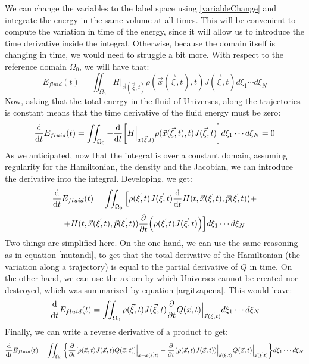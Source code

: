 \documentclass[11pt, a4paper]{article} %
\begin{document}
We can change the variables to the label space using \eqref{variableChange} and integrate the energy in the same volume at all times. This will be convenient to compute the variation in time of the energy, since it will allow us to introduce the time derivative inside the integral. Otherwise, because the domain itself is changing in time, we would need to struggle a bit more. With respect to the reference domain $\Omega_0$, we will have that:
\begin{equation}
E_{fluid}(t)=\iint_{\Omega_0} H\Big\rvert_{\vec{x}(\vec{\xi},t)}\rho(\vec{x}(\vec{\xi},t),t)J(\vec{\xi},t)d\xi_1\cdots d\xi_N
\end{equation}
Now, asking that the total energy in the fluid of Universes, along the trajectories is constant means that the time derivative of the fluid energy must be zero:
\begin{equation}
\dv{}{t}E_{fluid}(t)=\iint_{\Omega_0} -\dv{}{t}\qty[H\Big\rvert_{\vec{x}(\vec{\xi},t)}\rho(\vec{x}(\vec{\xi},t),t)J(\vec{\xi},t)]d\xi_1\cdots d\xi_N=0
\end{equation}
As we anticipated, now that the integral is over a constant domain, assuming regularity for the Hamiltonian, the density and the Jacobian, we can introduce the derivative into the integral. Developing, we get:
\begin{equation}
\dv{}{t}E_{fluid}(t)=\iint_{\Omega_0}\Big[ \rho(\vec{\xi},t)J(\vec{\xi},t)\dv{}{t}H(t, \vec{x}(\vec{\xi},t),\vec{p}(\vec{\xi},t))+
\end{equation}
$$
+H(t, \vec{x}(\vec{\xi},t),\vec{p}(\vec{\xi},t))\pdv{}{t}\qty(\rho(\vec{\xi},t)J(\vec{\xi},t))\Big]d\xi_1\cdots d\xi_N
$$
Two things are simplified here. On the one hand, we can use the same reasoning as in equation \eqref{mutandi}, to get that the total derivative of the Hamiltonian (the variation along a trajectory) is equal to the partial derivative of $Q$ in time. On the other hand, we can use the axiom by which Universes cannot be created nor destroyed, which was summarized by equation \eqref{argitzapena}. This would leave:
\begin{equation}
\dv{}{t}E_{fluid}(t)=\iint_{\Omega_0} \rho(\vec{\xi},t)J(\vec{\xi},t)\pdv{}{t}Q(\vec{x},t)\Big\rvert_{\vec{x}(\vec{\xi},t)}d\xi_1\cdots d\xi_N
\end{equation}
Finally, we can write a reverse derivative of a product to get:
\begin{equation}
\dv{}{t}E_{fluid}(t)=\iint_{\Omega_0}\qty{\pdv{}{t}\qty[ \rho(\vec{x},t)J(\vec{x},t)Q(\vec{x},t)]\Big\rvert_{\vec{x}=\vec{x}(\vec{\xi},t)}-\pdv{}{t}\qty( \rho(\vec{x},t)J(\vec{x},t))\Big\rvert_{\vec{x}(\vec{\xi},t)}Q(\vec{x},t)\Big\rvert_{\vec{x}(\vec{\xi},t)}}d\xi_1\cdots d\xi_N
\end{equation}
\end{document}
